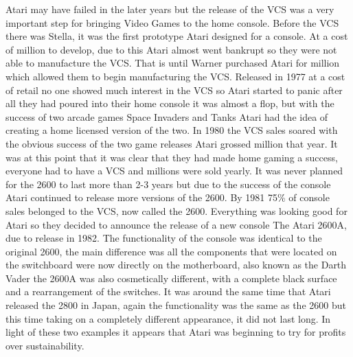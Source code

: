 \documentclass{scrartcl}
\begin{document}
Atari may have failed in the later years but the release of the VCS was a very important step for bringing Video Games to the home console. Before the VCS there was Stella, it was the first prototype Atari designed for a console. At a cost of  million to develop, due to this Atari almost went bankrupt so they were not able to manufacture the VCS. That is until Warner purchased Atari for  million which allowed them to begin manufacturing the VCS\cite{101}. Released in 1977 at a cost of  retail no one showed much interest in the VCS so Atari started to panic after all they had poured into their home console it was almost a flop, but with the success of two arcade games Space Invaders and Tanks Atari had the idea of creating a home licensed version of the two. In 1980 the VCS sales soared with the obvious success of the two game releases Atari grossed  million that year\cite{atarii}. It was at this point that it was clear that they had made home gaming a success, everyone had to have a VCS and millions were sold yearly.
\newline
\newline
It was never planned for the 2600 to last more than 2-3 years but due to the success of the console Atari continued to release more versions of the 2600. By 1981 75\% of console sales belonged to the VCS, now called the 2600. Everything was looking good for Atari so they decided to announce the release of a new console The Atari 2600A, due to release in 1982\cite{race}. The functionality of the console was identical to the original 2600, the main difference was all the components that were located on the switchboard were now directly on the motherboard, also known as the Darth Vader the 2600A was also cosmetically different, with a complete black surface and a rearrangement of the switches\cite{manual}. It was around the same time that Atari released the 2800 in Japan, again the functionality was the same as the 2600 but this time taking on a completely different appearance, it did not last long\cite{age}. In light of these two examples it appears that Atari was beginning to try for profits over sustainability.
\newline
\newline
\end{document}
